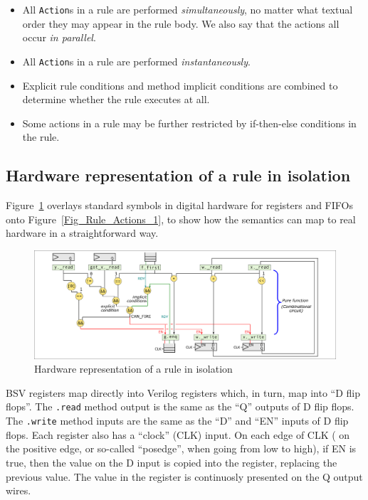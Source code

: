 \begin{itemize}

 \item All \verb|Action|s in a rule are performed
       \emph{simultaneously}, no matter what textual order they may
       appear in the rule body.  We also say that the actions all
       occur \emph{in parallel}.

 \item All \verb|Action|s in a rule are performed
       \emph{instantaneously}.

 \item Explicit rule conditions and method implicit conditions are
       combined to determine whether the rule executes at all.

 \item Some actions in a rule may be further restricted by
       if-then-else conditions in the rule.

\end{itemize}


\subsection{Hardware representation of a rule in isolation}

\label{Sec_HW_representation_of_a_rule}

Figure~\ref{Fig_Rule_Actions_1_2} overlays standard symbols in digital
hardware for registers and FIFOs onto Figure~\ref{Fig_Rule_Actions_1},
to show how the semantics can map to real hardware in a
straightforward way.
\begin{figure}[htbp]
  \centerline{\includegraphics[width=6in,angle=0]{Figures/Fig_Rule_Actions_1_2}}
  \caption{\label{Fig_Rule_Actions_1_2} Hardware representation of a rule in isolation}
\end{figure}

BSV registers map directly into Verilog registers which, in turn, map
into ``D flip flops''.  The \verb|.read| method output is the same as
the ``Q'' outputs of D flip flops.  The \verb|.write| method inputs
are the same as the ``D'' and ``EN'' inputs of D flip flops.  Each
register also has a ``clock'' (CLK) input.  On each edge of CLK ({\eg}
on the positive edge, or so-called ``posedge'', when going from low to
high), if EN is true, then the value on the D input is copied into the
register, replacing the previous value.  The value in the register is
continuosly presented on the Q output wires.

